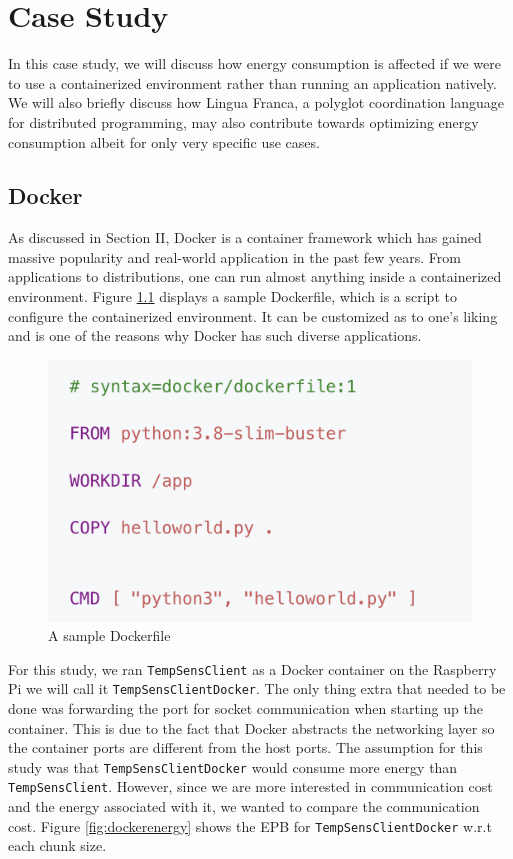 \chapter{Case Study}
In this case study, we will discuss how energy consumption is affected if we were to use a containerized environment 
rather than running an application natively. We will also briefly discuss how Lingua Franca, a polyglot coordination 
language for distributed programming, may also contribute towards optimizing energy consumption \textemdash 
albeit for only very specific use cases. 
\section{Docker}
As discussed in Section II, Docker \cite{turnbull_2014} is a container framework which has gained massive 
popularity and real-world application in the past few years. From applications to distributions, one can run 
almost anything inside a containerized environment. Figure \ref{fig:dockerfile} displays a sample 
Dockerfile, which is a script to configure the containerized environment. It can be customized as to one's liking 
and is one of the reasons why Docker has such diverse applications. \\

\begin{figure}
    \begin{center}
        \includegraphics[scale=0.35]{Figs/dockerfile.png}    
    \end{center}
    \caption{A sample Dockerfile}
    \label{fig:dockerfile}
\end{figure}

For this study, we ran \texttt{TempSensClient} as a Docker container on the Raspberry Pi \textemdash we will call 
it \texttt{TempSensClientDocker}. The only thing extra that 
needed to be done was forwarding the port for socket communication when starting up the container. This is due to the 
fact that Docker abstracts the networking layer so the container ports are different from the host ports. The 
assumption for this study was that \texttt{TempSensClientDocker} would consume more energy than \texttt{TempSensClient}. 
However, since we are more interested in communication cost and the energy associated with it, we wanted to 
compare the communication cost. Figure \ref{fig:dockerenergy} shows the EPB for \texttt{TempSensClientDocker} w.r.t 
each chunk size. \\

